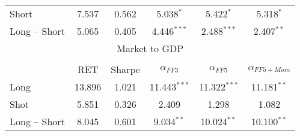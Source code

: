 \begin{table}[!htbp]
\begin{adjustbox}{width=\textwidth,max height=.43\totalheight}
\begin{tabular}{lccccc}
		Short & 7.537 & 0.562 & 5.038$^{*}$ & 5.422$^{*}$ & 5.318$^{*}$ \\
		Long $–$ Short & 5.065 & 0.405 & 4.446$^{***}$ & 2.488$^{***}$ & 2.407$^{**}$ \\
		\multicolumn{6}{c}{Market to GDP}\\
		\hline\\[-1.8ex]
		 & RET & Sharpe & $\alpha_{FF3}$ & $\alpha_{FF5}$ & $\alpha_{FF5+Mom}$ \\
		 \cline{2-6}
		Long & 13.896 & 1.021 & 11.443$^{***}$ & 11.322$^{***}$ & 11.181$^{**}$ \\
		Shot & 5.851 & 0.326 & 2.409 & 1.298 & 1.082 \\
		Long $–$ Short & 8.045 & 0.601 & 9.034$^{**}$ & 10.024$^{**}$ & 10.100$^{**}$\\
		\hline
	\end{tabular}
	\end{adjustbox}
\end{table}
%	
%	
\clearpage

